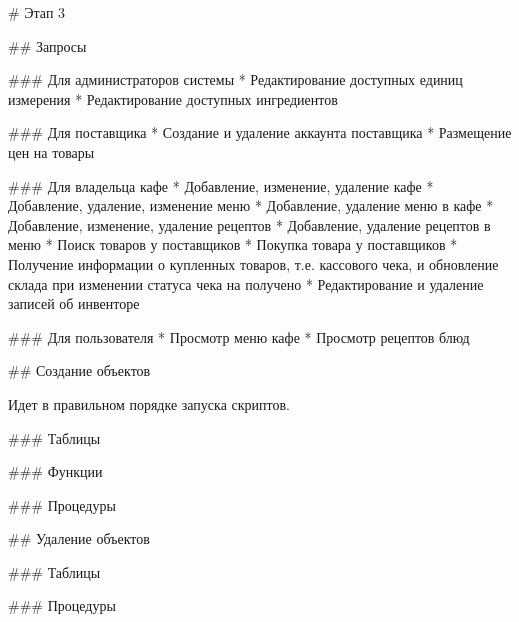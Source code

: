 \begin{markdown}
# Этап 3

## Запросы

### Для администраторов системы
* Редактирование доступных единиц измерения
* Редактирование доступных ингредиентов

### Для поставщика
* Создание и удаление аккаунта поставщика
* Размещение цен на товары

### Для владельца кафе
* Добавление, изменение, удаление кафе 
* Добавление, удаление, изменение меню
* Добавление, удаление меню в кафе
* Добавление, изменение, удаление рецептов
* Добавление, удаление рецептов в меню
* Поиск товаров у поставщиков
* Покупка товара у поставщиков
* Получение информации о купленных товаров, т.е. кассового чека, и обновление склада при изменении статуса чека на получено
* Редактирование и удаление записей об инвенторе

### Для пользователя
* Просмотр меню кафе
* Просмотр рецептов блюд

## Создание объектов

Идет в правильном порядке запуска скриптов.

### Таблицы
\end{markdown}


\begin{markdown}
### Функции
\end{markdown}


\begin{markdown}
### Процедуры
\end{markdown}


\begin{markdown}
## Удаление объектов

### Таблицы
\end{markdown}


\begin{markdown}
### Процедуры
\end{markdown}


